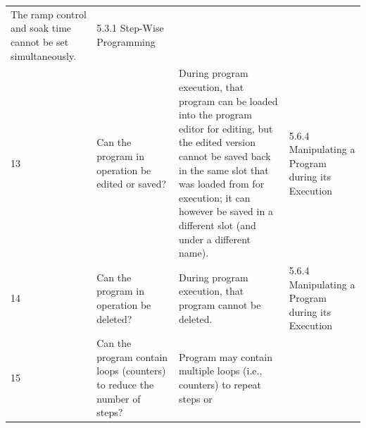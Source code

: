 \begin{longtable}[]{@{}llll@{}}
\begin{minipage}[t]{0.33\columnwidth}
The ramp control and soak time cannot be set simultaneously.\strut
\end{minipage} & \begin{minipage}[t]{0.17\columnwidth}\raggedright
5.3.1 Step-Wise Programming\strut
\end{minipage}\tabularnewline
\begin{minipage}[t]{0.08\columnwidth}\raggedright
13\strut
\end{minipage} & \begin{minipage}[t]{0.30\columnwidth}\raggedright
Can the program in operation be edited or saved?\strut
\end{minipage} & \begin{minipage}[t]{0.33\columnwidth}\raggedright
During program execution, that program can be loaded into the program
editor for editing, but the edited version cannot be saved back in the
same slot that was loaded from for execution; it can however be saved in
a different slot (and under a different name).\strut
\end{minipage} & \begin{minipage}[t]{0.17\columnwidth}\raggedright
5.6.4 Manipulating a Program during its Execution\strut
\end{minipage}\tabularnewline
\begin{minipage}[t]{0.08\columnwidth}\raggedright
14\strut
\end{minipage} & \begin{minipage}[t]{0.30\columnwidth}\raggedright
Can the program in operation be deleted?\strut
\end{minipage} & \begin{minipage}[t]{0.33\columnwidth}\raggedright
During program execution, that program cannot be deleted.\strut
\end{minipage} & \begin{minipage}[t]{0.17\columnwidth}\raggedright
5.6.4 Manipulating a Program during its Execution\strut
\end{minipage}\tabularnewline
\begin{minipage}[t]{0.08\columnwidth}\raggedright
15\strut
\end{minipage} & \begin{minipage}[t]{0.30\columnwidth}\raggedright
Can the program contain loops (counters) to reduce the number of
steps?\strut
\end{minipage} & \begin{minipage}[t]{0.33\columnwidth}\raggedright
Program may contain multiple loops (i.e., counters) to repeat steps or

\end{minipage}
\end{longtable}
